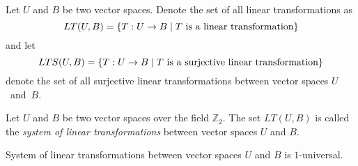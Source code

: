 \begin{definition}
\label{definition-linear-transformations}
Let $U$ and $B$ be two vector spaces. Denote the set of all linear transformations as
\[
LT(U, B) = \{ T: U \rightarrow B \mid T \text{ is a linear transformation} \}
\]
and let
\[
LTS(U, B) = \{ T: U \rightarrow B \mid T \text{ is a surjective linear transformation} \}
\] denote the set of all surjective linear transformations between vector spaces $U$~and~$B$.
\end{definition} 

\begin{definition}
\label{definition-system-of-linear-transformations}
Let $U$ and $B$ be two vector spaces over the field $\mathbb{Z}_2$. The set $LT(U, B)$ is called the \emph{system of linear transformations} between vector spaces $U$ and $B$.
\end{definition}
\begin{remark}
\label{remark-system-of-linear-transformations}
System of linear transformations between vector spaces $U$ and $B$ is $1$-universal.
\end{remark}
